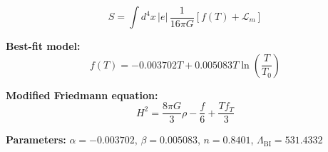 
\begin{equation}
  S = \int d^4x \, |e| \, \frac{1}{16\pi G} \left[ f(T) + \mathcal{L}_m \right]
\end{equation}

\textbf{Best-fit model:}
\begin{equation}
  f(T) = -0.003702 T + 0.005083 T \ln\!\left(\frac{T}{T_0}\right)
\end{equation}

\textbf{Modified Friedmann equation:}
\begin{equation}
  H^2 = \frac{8\pi G}{3} \rho - \frac{f}{6} + \frac{T f_T}{3}
\end{equation}

\textbf{Parameters:}
$\alpha = -0.003702$, \quad
$\beta = 0.005083$, \quad
$n = 0.8401$, \quad
$\Lambda_{\text{BI}} = 531.4332$
